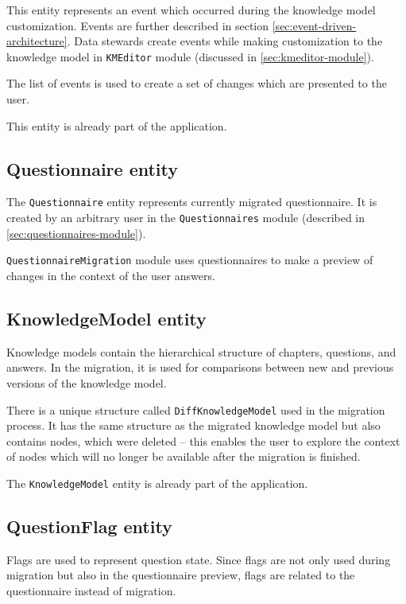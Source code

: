 This entity represents an event which occurred during the knowledge model customization.
Events are further described in section \ref{sec:event-driven-architecture}.
Data stewards create events while making customization to the knowledge model in \texttt{KMEditor} module (discussed in \ref{sec:kmeditor-module}).

The list of events is used to create a set of changes which are presented to the user.

This entity is already part of the application.

\subsection{Questionnaire entity}

The \texttt{Questionnaire} entity represents currently migrated questionnaire.
It is created by an arbitrary user in the \texttt{Questionnaires} module (described in \ref{sec:questionnaires-module}).

\texttt{QuestionnaireMigration} module uses questionnaires to make a preview of changes in the context of the user answers.

\subsection{KnowledgeModel entity}

Knowledge models contain the hierarchical structure of chapters, questions, and answers.
In the migration, it is used for comparisons between new and previous versions of the knowledge model.

There is a unique structure called \texttt{DiffKnowledgeModel} used in the migration process.
It has the same structure as the migrated knowledge model but also contains nodes, which were deleted -- this enables the user to explore the context of nodes which will no longer be available after the migration is finished.

The \texttt{KnowledgeModel} entity is already part of the application.

\subsection{QuestionFlag entity}

Flags are used to represent question state.
Since flags are not only used during migration but also in the questionnaire preview, flags are related to the questionnaire instead of migration.

